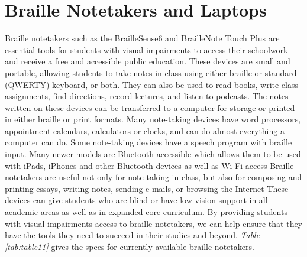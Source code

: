 \pagebreak
\hypertarget{braille-notetakers-and-braille-laptop-computers}{}\section{Braille Notetakers and Laptops}\label{braille-notetakers-and-braille-laptop-computers}

Braille notetakers such as the BrailleSense6 and BrailleNote Touch Plus are essential tools for students with visual impairments to access their schoolwork and receive a free and accessible public education. These devices are small and portable, allowing students to take notes in class using either braille or standard (QWERTY) keyboard, or both. They can also be used to read books, write class assignments, find directions, record lectures, and listen to podcasts. The notes written on these devices can be transferred to a computer for storage or printed in either braille or print formats. Many note-taking devices have word processors, appointment calendars, calculators or clocks, and can do almost everything a computer can do. Some note-taking devices have a speech program with braille input. Many newer models are Bluetooth accessible which allows them to be used with iPads, iPhones and other Bluetooth devices as well as Wi-Fi access Braille notetakers are useful not only for note taking in class, but also for composing and printing essays, writing notes, sending e-mails, or browsing the Internet These devices can give students who are blind or have low vision support in all academic areas as well as in expanded core curriculum. By providing students with visual impairments access to braille notetakers, we can help ensure that they have the tools they need to succeed in their studies and beyond. \textit{Table \ref{tab:table11}} gives the specs for currently available braille notetakers.

\pagebreak 
 
